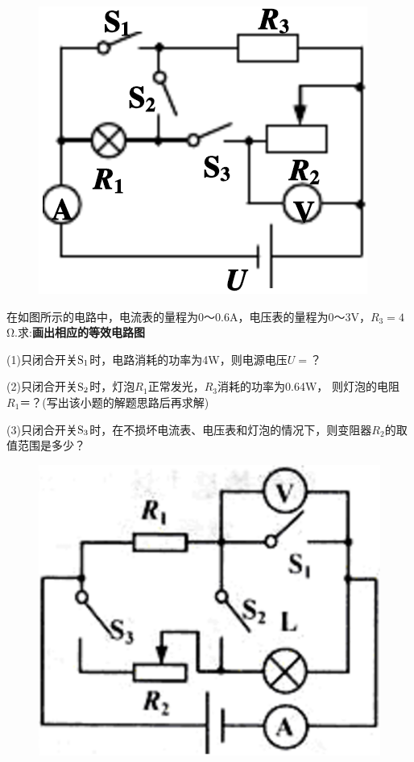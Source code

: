 \documentclass[11pt,a4paper]{article}
\newcommand{\nianfen}[1]{\hspace{-2em}{(#1\textbf{·}\textit{青岛})}}
\begin{document}
{	\begin{figure}
		\includegraphics[width=\linewidth]{2011}
	\end{figure}
	
	\nianfen{2011}在如图所示的电路中，电流表的量程为0～0.6A，电压表的量程为0～3V，$ R_3=4 $Ω.求:\textbf{画出相应的等效电路图}
	
	(1)只闭合开关$\rm S_1 $时，电路消耗的功率为4W，则电源电压$ U= $？
	
	(2)只闭合开关$\rm S_2 $时，灯泡$ R_1 $正常发光，$ R_3 $消耗的功率为0.64W， 则灯泡的电阻$ R_1＝ $？(写出该小题的解题思路后再求解)
	
	(3)只闭合开关$\rm S_3 $时，在不损坏电流表、电压表和灯泡的情况下，则变阻器$ R_2 $的取值范围是多少？
	\clearpage
	
	\begin{figure}
		\includegraphics[width=\linewidth]{2010}
	\end{figure}

}
\end{document}

